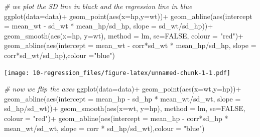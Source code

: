 \documentclass[
]{book}
\newenvironment{Shaded}{\begin{snugshade}}{\end{snugshade}}
\newcommand{\AttributeTok}[1]{\textcolor[rgb]{0.77,0.63,0.00}{#1}}
\newcommand{\CommentTok}[1]{\textcolor[rgb]{0.56,0.35,0.01}{\textit{#1}}}
\newcommand{\ConstantTok}[1]{\textcolor[rgb]{0.00,0.00,0.00}{#1}}
\newcommand{\FunctionTok}[1]{\textcolor[rgb]{0.00,0.00,0.00}{#1}}
\newcommand{\NormalTok}[1]{#1}
\newcommand{\SpecialCharTok}[1]{\textcolor[rgb]{0.00,0.00,0.00}{#1}}
\newcommand{\StringTok}[1]{\textcolor[rgb]{0.31,0.60,0.02}{#1}}
\begin{document}
\begin{Shaded}
\begin{Highlighting}[]
\CommentTok{\# we plot the SD line in black and the regression line in blue}
\FunctionTok{ggplot}\NormalTok{(}\AttributeTok{data=}\NormalTok{data)}\SpecialCharTok{+}
  \FunctionTok{geom\_point}\NormalTok{(}\FunctionTok{aes}\NormalTok{(}\AttributeTok{x=}\NormalTok{hp,}\AttributeTok{y=}\NormalTok{wt))}\SpecialCharTok{+}
  \FunctionTok{geom\_abline}\NormalTok{(}\FunctionTok{aes}\NormalTok{(}\AttributeTok{intercept =}\NormalTok{ mean\_wt }\SpecialCharTok{{-}}\NormalTok{ sd\_wt }\SpecialCharTok{*}\NormalTok{ mean\_hp}\SpecialCharTok{/}\NormalTok{sd\_hp, }\AttributeTok{slope =}\NormalTok{ sd\_wt}\SpecialCharTok{/}\NormalTok{sd\_hp))}\SpecialCharTok{+}
  \FunctionTok{geom\_smooth}\NormalTok{(}\FunctionTok{aes}\NormalTok{(}\AttributeTok{x=}\NormalTok{hp, }\AttributeTok{y=}\NormalTok{wt), }\AttributeTok{method =}\NormalTok{ lm, }\AttributeTok{se=}\ConstantTok{FALSE}\NormalTok{, }\AttributeTok{colour =} \StringTok{"red"}\NormalTok{)}\SpecialCharTok{+}
  \FunctionTok{geom\_abline}\NormalTok{(}\FunctionTok{aes}\NormalTok{(}\AttributeTok{intercept =}\NormalTok{ mean\_wt }\SpecialCharTok{{-}}\NormalTok{ corr}\SpecialCharTok{*}\NormalTok{sd\_wt }\SpecialCharTok{*}\NormalTok{ mean\_hp}\SpecialCharTok{/}\NormalTok{sd\_hp, }\AttributeTok{slope =}\NormalTok{ corr}\SpecialCharTok{*}\NormalTok{sd\_wt}\SpecialCharTok{/}\NormalTok{sd\_hp),}\AttributeTok{colour =}\StringTok{"blue"}\NormalTok{)}
\end{Highlighting}
\end{Shaded}

\texttt{[image: 10-regression\_files/figure-latex/unnamed-chunk-1-1.pdf]}

\begin{Shaded}
\begin{Highlighting}[]
\CommentTok{\# now we flip the axes}
\FunctionTok{ggplot}\NormalTok{(}\AttributeTok{data=}\NormalTok{data)}\SpecialCharTok{+}
  \FunctionTok{geom\_point}\NormalTok{(}\FunctionTok{aes}\NormalTok{(}\AttributeTok{x=}\NormalTok{wt,}\AttributeTok{y=}\NormalTok{hp))}\SpecialCharTok{+}
  \FunctionTok{geom\_abline}\NormalTok{(}\FunctionTok{aes}\NormalTok{(}\AttributeTok{intercept =}\NormalTok{ mean\_hp }\SpecialCharTok{{-}}\NormalTok{ sd\_hp }\SpecialCharTok{*}\NormalTok{ mean\_wt}\SpecialCharTok{/}\NormalTok{sd\_wt, }\AttributeTok{slope =}\NormalTok{ sd\_hp}\SpecialCharTok{/}\NormalTok{sd\_wt))}\SpecialCharTok{+}
  \FunctionTok{geom\_smooth}\NormalTok{(}\FunctionTok{aes}\NormalTok{(}\AttributeTok{x=}\NormalTok{wt, }\AttributeTok{y=}\NormalTok{hp), }\AttributeTok{method =}\NormalTok{ lm, }\AttributeTok{se=}\ConstantTok{FALSE}\NormalTok{, }\AttributeTok{colour =} \StringTok{"red"}\NormalTok{)}\SpecialCharTok{+}
  \FunctionTok{geom\_abline}\NormalTok{(}\FunctionTok{aes}\NormalTok{(}\AttributeTok{intercept =}\NormalTok{ mean\_hp }\SpecialCharTok{{-}}\NormalTok{ corr}\SpecialCharTok{*}\NormalTok{sd\_hp }\SpecialCharTok{*}\NormalTok{ mean\_wt}\SpecialCharTok{/}\NormalTok{sd\_wt, }\AttributeTok{slope =}\NormalTok{ corr }\SpecialCharTok{*}\NormalTok{ sd\_hp}\SpecialCharTok{/}\NormalTok{sd\_wt),}\AttributeTok{colour =} \StringTok{"blue"}\NormalTok{)}
\end{Highlighting}
\end{Shaded}
\end{document}
